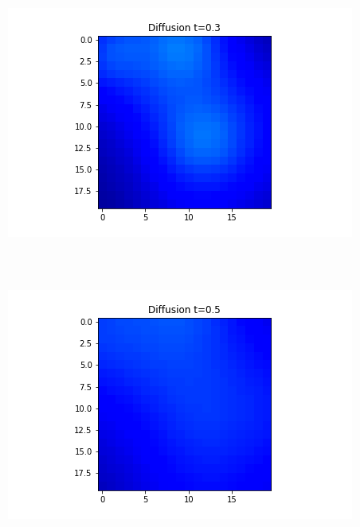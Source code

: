 \documentclass[10pt,a4paper]{article}
\begin{document}
\begin{enumerate}[i)]
\begin{enumerate}[a)]
\begin{figure}[!h]
\begin{subfigure}[b]{0.25\textwidth}
         				\includegraphics[width= \textwidth]{images/mellin-x2-t3.png}
         			\end{subfigure}~
         			\begin{subfigure}[b]{0.25\textwidth}
         				\includegraphics[width= \textwidth]{images/mellin-x2-t5.png}
         			\end{subfigure}
         			\caption{}
         		\end{figure}
         	    \begin{figure}[!h]
         	    	\centering
         	    	\begin{subfigure}[b]{0.25\textwidth}

\end{subfigure}
\end{figure}
\end{enumerate}
\end{enumerate}
\end{document}
